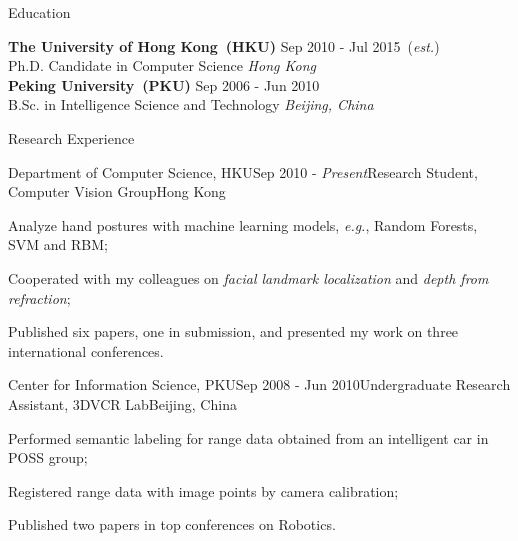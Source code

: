 \documentclass{cv_professional-en} %
\begin{document}

\begin{rSection}{Education}

{\bf The University of Hong Kong~(HKU)} \hfill Sep 2010 - Jul 2015~(\textit{est.}) \\ 
Ph.D. Candidate in Computer Science \hfill {\em Hong Kong}\smallskip \\
{\bf Peking University~(PKU)} \hfill Sep 2006 - Jun 2010 \\ 
B.Sc. in Intelligence Science and Technology \hfill {\em Beijing, China} 

\end{rSection}


\begin{rSection}{Research Experience}
    
\begin{rSubsection}{Department of Computer Science, HKU}{Sep 2010 - \textit{Present}}{Research Student, Computer Vision Group}{Hong Kong}
\item Analyze hand postures with machine learning models, \textit{e.g.}, Random Forests, SVM and RBM;
\item Cooperated with my colleagues on \textit{facial landmark localization} and \textit{depth from refraction};
\item Published six papers, one in submission, and presented my work on three international conferences.
\end{rSubsection}

\begin{rSubsection}{Center for Information Science, PKU}{Sep 2008 - Jun 2010}{Undergraduate Research Assistant, 3DVCR Lab}{Beijing, China}
    \item Performed semantic labeling for range data obtained from an intelligent car in POSS group;
    \item Registered range data with image points by camera calibration;
    \item Published two papers in top conferences on Robotics.
\end{rSubsection}

\end{rSection}
\end{document}
